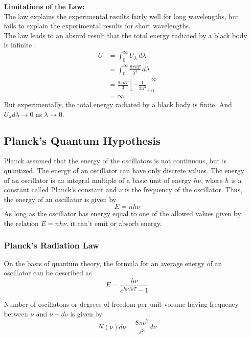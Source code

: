 \documentclass[12pt]{article}
\numberwithin{equation}{subsection}
\begin{document}
\textbf{Limitations of the Law:} \\
The law explains the experimental results fairly well for long wavelengths, but fails to explain the experimental results for short wavelengths. \\
The law leads to an absurd result that the total energy radiated by a black body is infinite :
\begin{align*}
    U &= \int_{0}^{\infty} {U_{\lambda}} \: d{\lambda} \\
    &= \int_{0}^{\infty} {\frac{8\pi kT}{\lambda^4}} \: d{\lambda} \\
    &= \frac{8\pi kT}{3} \left[ -\frac{1}{3\lambda^3} \right]_{0}^{\infty} \\
    &= \infty
\end{align*}
But experimentally, the total energy radiated by a black body is finite. And $U_{\lambda} d\lambda \to 0$ as $\lambda \to 0$.

\subsection{Planck's Quantum Hypothesis}
Planck assumed that the energy of the oscillators is not continuous, but is quantized. The energy of an oscillator can have only discrete values. The energy of an oscillator is an integral multiple of a basic unit of energy $h\nu$, where $h$ is a constant called Planck's constant and $\nu$ is the frequency of the oscillator. Thus, the energy of an oscillator is given by
\begin{equation}
    E = nh\nu
\end{equation}
As long as the oscillator has energy equal to one of the allowed values given by the relation $E=nh\nu$, it can't emit or absorb energy.

\subsubsection{Planck's Radiation Law}
On the basis of quantum theory, the formula for an average energy of an oscillator can be described as
\begin{equation}
    \boxed{ E = \frac{h\nu}{e^{h\nu/kT}-1} }
\end{equation}

Number of oscillatons or degrees of freedom per unit volume having frequency between $\nu$ and $\nu+d\nu$ is given by
\begin{equation}
    N(\nu) d\nu = \frac{8\pi\nu^2}{c^3} d\nu
\end{equation}
\end{document}
